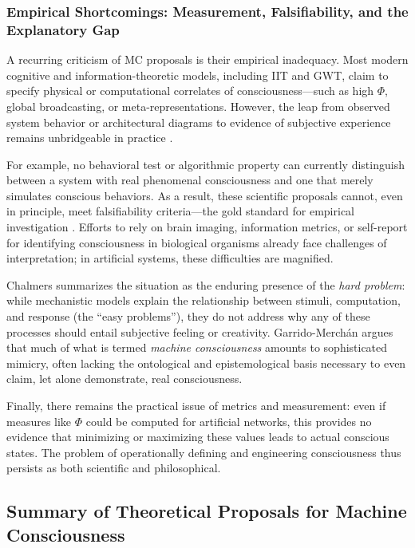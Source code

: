 \subsubsection{Empirical Shortcomings: Measurement, Falsifiability, and the Explanatory Gap}

A recurring criticism of MC proposals is their empirical inadequacy. Most modern cognitive and information-theoretic models, including IIT and GWT, claim to specify physical or computational correlates of consciousness---such as high $\Phi$, global broadcasting, or meta-representations. However, the leap from observed system behavior or architectural diagrams to evidence of subjective experience remains unbridgeable in practice \cite{garridomerchan2024machine,levine1983materialism}.

For example, no behavioral test or algorithmic property can currently distinguish between a system with real phenomenal consciousness and one that merely simulates conscious behaviors. As a result, these scientific proposals cannot, even in principle, meet falsifiability criteria---the gold standard for empirical investigation \cite{butlin2023consciousness,francken2022consciousness}. Efforts to rely on brain imaging, information metrics, or self-report for identifying consciousness in biological organisms already face challenges of interpretation; in artificial systems, these difficulties are magnified.

Chalmers \cite{chalmers1995facing} summarizes the situation as the enduring presence of the \emph{hard problem}: while mechanistic models explain the relationship between stimuli, computation, and response (the ``easy problems''), they do not address why any of these processes should entail subjective feeling or creativity. Garrido-Merchán \cite{garridomerchan2024machine} argues that much of what is termed \emph{machine consciousness} amounts to sophisticated mimicry, often lacking the ontological and epistemological basis necessary to even claim, let alone demonstrate, real consciousness.

Finally, there remains the practical issue of metrics and measurement: even if measures like $\Phi$ could be computed for artificial networks, this provides no evidence that minimizing or maximizing these values leads to actual conscious states. The problem of operationally defining and engineering consciousness thus persists as both scientific and philosophical.

\subsection{Summary of Theoretical Proposals for Machine Consciousness}
\label{subsec:summary_mc_proposals}

